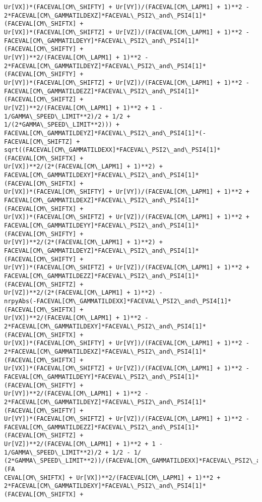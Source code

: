 \documentclass[landscape,letterpaper,10pt,english]{article}
\begin{document}
\begin{Verbatim}[commandchars=\\\{\}]
Ur[VX])*(FACEVAL[CM\_SHIFTY] + Ur[VY])/(FACEVAL[CM\_LAPM1] + 1)**2 -
2*FACEVAL[CM\_GAMMATILDEXZ]*FACEVAL\_PSI2\_and\_PSI4[1]*(FACEVAL[CM\_SHIFTX] +
Ur[VX])*(FACEVAL[CM\_SHIFTZ] + Ur[VZ])/(FACEVAL[CM\_LAPM1] + 1)**2 -
FACEVAL[CM\_GAMMATILDEYY]*FACEVAL\_PSI2\_and\_PSI4[1]*(FACEVAL[CM\_SHIFTY] +
Ur[VY])**2/(FACEVAL[CM\_LAPM1] + 1)**2 -
2*FACEVAL[CM\_GAMMATILDEYZ]*FACEVAL\_PSI2\_and\_PSI4[1]*(FACEVAL[CM\_SHIFTY] +
Ur[VY])*(FACEVAL[CM\_SHIFTZ] + Ur[VZ])/(FACEVAL[CM\_LAPM1] + 1)**2 -
FACEVAL[CM\_GAMMATILDEZZ]*FACEVAL\_PSI2\_and\_PSI4[1]*(FACEVAL[CM\_SHIFTZ] +
Ur[VZ])**2/(FACEVAL[CM\_LAPM1] + 1)**2 + 1 - 1/GAMMA\_SPEED\_LIMIT**2)/2 + 1/2 +
1/(2*GAMMA\_SPEED\_LIMIT**2))) +
FACEVAL[CM\_GAMMATILDEYZ]*FACEVAL\_PSI2\_and\_PSI4[1]*(-FACEVAL[CM\_SHIFTZ] +
sqrt((FACEVAL[CM\_GAMMATILDEXX]*FACEVAL\_PSI2\_and\_PSI4[1]*(FACEVAL[CM\_SHIFTX] +
Ur[VX])**2/(2*(FACEVAL[CM\_LAPM1] + 1)**2) +
FACEVAL[CM\_GAMMATILDEXY]*FACEVAL\_PSI2\_and\_PSI4[1]*(FACEVAL[CM\_SHIFTX] +
Ur[VX])*(FACEVAL[CM\_SHIFTY] + Ur[VY])/(FACEVAL[CM\_LAPM1] + 1)**2 +
FACEVAL[CM\_GAMMATILDEXZ]*FACEVAL\_PSI2\_and\_PSI4[1]*(FACEVAL[CM\_SHIFTX] +
Ur[VX])*(FACEVAL[CM\_SHIFTZ] + Ur[VZ])/(FACEVAL[CM\_LAPM1] + 1)**2 +
FACEVAL[CM\_GAMMATILDEYY]*FACEVAL\_PSI2\_and\_PSI4[1]*(FACEVAL[CM\_SHIFTY] +
Ur[VY])**2/(2*(FACEVAL[CM\_LAPM1] + 1)**2) +
FACEVAL[CM\_GAMMATILDEYZ]*FACEVAL\_PSI2\_and\_PSI4[1]*(FACEVAL[CM\_SHIFTY] +
Ur[VY])*(FACEVAL[CM\_SHIFTZ] + Ur[VZ])/(FACEVAL[CM\_LAPM1] + 1)**2 +
FACEVAL[CM\_GAMMATILDEZZ]*FACEVAL\_PSI2\_and\_PSI4[1]*(FACEVAL[CM\_SHIFTZ] +
Ur[VZ])**2/(2*(FACEVAL[CM\_LAPM1] + 1)**2) -
nrpyAbs(-FACEVAL[CM\_GAMMATILDEXX]*FACEVAL\_PSI2\_and\_PSI4[1]*(FACEVAL[CM\_SHIFTX] +
Ur[VX])**2/(FACEVAL[CM\_LAPM1] + 1)**2 -
2*FACEVAL[CM\_GAMMATILDEXY]*FACEVAL\_PSI2\_and\_PSI4[1]*(FACEVAL[CM\_SHIFTX] +
Ur[VX])*(FACEVAL[CM\_SHIFTY] + Ur[VY])/(FACEVAL[CM\_LAPM1] + 1)**2 -
2*FACEVAL[CM\_GAMMATILDEXZ]*FACEVAL\_PSI2\_and\_PSI4[1]*(FACEVAL[CM\_SHIFTX] +
Ur[VX])*(FACEVAL[CM\_SHIFTZ] + Ur[VZ])/(FACEVAL[CM\_LAPM1] + 1)**2 -
FACEVAL[CM\_GAMMATILDEYY]*FACEVAL\_PSI2\_and\_PSI4[1]*(FACEVAL[CM\_SHIFTY] +
Ur[VY])**2/(FACEVAL[CM\_LAPM1] + 1)**2 -
2*FACEVAL[CM\_GAMMATILDEYZ]*FACEVAL\_PSI2\_and\_PSI4[1]*(FACEVAL[CM\_SHIFTY] +
Ur[VY])*(FACEVAL[CM\_SHIFTZ] + Ur[VZ])/(FACEVAL[CM\_LAPM1] + 1)**2 -
FACEVAL[CM\_GAMMATILDEZZ]*FACEVAL\_PSI2\_and\_PSI4[1]*(FACEVAL[CM\_SHIFTZ] +
Ur[VZ])**2/(FACEVAL[CM\_LAPM1] + 1)**2 + 1 - 1/GAMMA\_SPEED\_LIMIT**2)/2 + 1/2 - 1/
(2*GAMMA\_SPEED\_LIMIT**2))/(FACEVAL[CM\_GAMMATILDEXX]*FACEVAL\_PSI2\_and\_PSI4[1]*(FA
CEVAL[CM\_SHIFTX] + Ur[VX])**2/(FACEVAL[CM\_LAPM1] + 1)**2 +
2*FACEVAL[CM\_GAMMATILDEXY]*FACEVAL\_PSI2\_and\_PSI4[1]*(FACEVAL[CM\_SHIFTX] +

\end{Verbatim}
\end{document}
